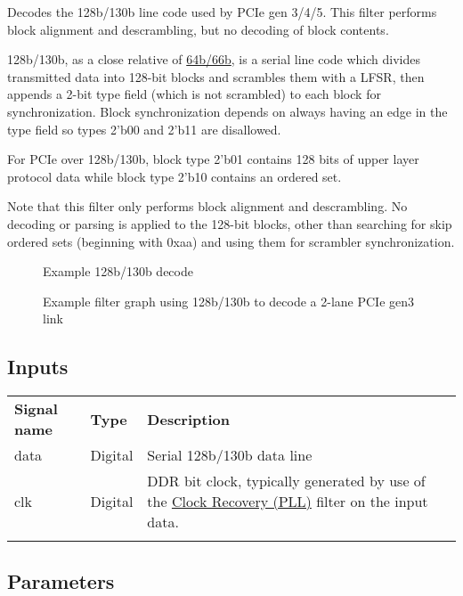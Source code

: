 Decodes the 128b/130b line code used by PCIe gen 3/4/5. This filter performs block alignment and descrambling, but no
decoding of block contents.

128b/130b, as a close relative of \hyperref[filter:128b130b]{64b/66b}, is a serial line code which divides transmitted
data into 128-bit blocks and scrambles them with a LFSR, then appends a 2-bit type field (which is not scrambled) to
each block for synchronization. Block synchronization depends on always having an edge in the type field so types 2'b00
and 2'b11 are disallowed.

For PCIe over 128b/130b, block type 2'b01 contains 128 bits of upper layer protocol data while block type 2'b10
contains an ordered set.

Note that this filter only performs block alignment and descrambling. No decoding or parsing is applied to the 128-bit
blocks, other than searching for skip ordered sets (beginning with 0xaa) and using them for scrambler synchronization.

\begin{figure}[h]
\centering
{}
\caption{Example 128b/130b decode}
\label{filter_128b130b}
\end{figure}

\begin{figure}[h]
\centering
{}
\caption{Example filter graph using 128b/130b to decode a 2-lane PCIe gen3 link}
\label{filter_graph_128b130b}
\end{figure}

\subsection{Inputs}

\begin{tabularx}{16cm}{llX}
\thickhline
\textbf{Signal name} & \textbf{Type} & \textbf{Description} \\
\thickhline
data & Digital & Serial 128b/130b data line \\
\thinhline
clk & Digital & DDR bit clock, typically generated by use of the \hyperref[filter:cdrpll]{Clock Recovery
(PLL)} filter on the input data.\\
\thickhline
\end{tabularx}

\subsection{Parameters}

